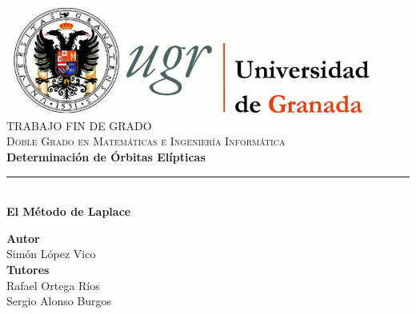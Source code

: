 \begin{titlepage}
 
 
\newlength{\centeroffset}
\setlength{\centeroffset}{-0.5\oddsidemargin}
\addtolength{\centeroffset}{0.5\evensidemargin}
\thispagestyle{empty}

\noindent\hspace*{\centeroffset}

\begin{minipage}{\textwidth}
	\centering
	\includegraphics[width=0.9\textwidth]{images/logo_ugr.jpg}\\[1.2cm]
	
	\textsc{\Large TRABAJO FIN DE GRADO\\[0.2cm]}
	\textsc{Doble Grado en Matemáticas e Ingeniería Informática}\\[0.8cm]
	{\huge\bfseries Determinación de Órbitas Elípticas\\
	}
	\noindent\rule[-1ex]{\textwidth}{1pt}\\[2.5ex]
	{\Large\bfseries El Método de Laplace}
\end{minipage}

\vspace{1cm}

\noindent\hspace*{\centeroffset}

\begin{minipage}{\textwidth}
	\centering
	\textbf{Autor}\\ {Simón López Vico}\\[2.5ex]
	\textbf{Tutores}\\ {Rafael Ortega Ríos\\Sergio Alonso Burgos}\\[1.5cm]
	

\end{minipage}
\end{titlepage}
